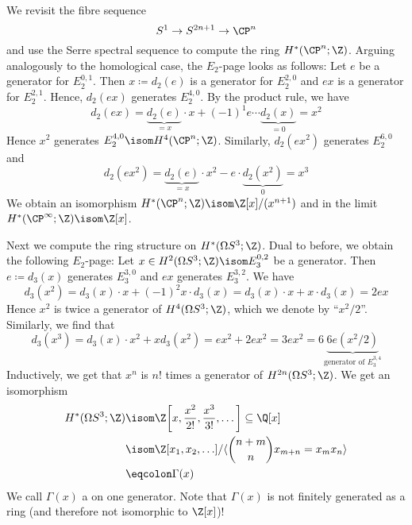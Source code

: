 \documentclass[wip, topology]{bsteffan-lecturenotes}
\begin{document}
\begin{example}
	We revisit the fibre sequence
	\begin{equation*}
		S^1 \to S^{2n + 1} \to \CP^n
	\end{equation*}
	and use the Serre spectral sequence to compute the ring $H^*(\CP^n; \Z)$.
	Arguing analogously to the homological case, the $E_2$-page looks as follows:
	Let $e$ be a generator for $E_2^{0, 1}$.
	Then $x \coloneq d_2(e)$ is a generator for $E_2^{2, 0}$ and $e x$ is a generator for $E_2^{2, 1}$.
	Hence, $d_2(ex)$ generates $E_2^{4, 0}$.
	By the product rule, we have
	\begin{equation*}
		d_2(ex) = \underbrace{d_2(e)}_{= x} \cdot x + (-1)^1 e \cdots \underbrace{d_2(x)}_{= 0} = x^2
	\end{equation*}
	Hence $x^2$ generates $E_2^{4, 0} \isom H^4(\CP^n; \Z)$.
	Similarly, $d_2(ex^2)$ generates $E_2^{6, 0}$ and
	\begin{equation*}
		d_2(ex^2) = \underbrace{d_2(e)}_{= x} \cdot x^2 - e \cdot \underbrace{d_2(x^2)}_{0} = x^3
	\end{equation*}
	We obtain an isomorphism $H^*(\CP^n; \Z) \isom \Z[x] / (x^{n + 1})$ and in the limit $H^*(\CP^\infty; \Z) \isom \Z[x]$.
\end{example}
\begin{example}
	Next we compute the ring structure on $H^*(\Omega S^3; \Z)$.
	Dual to before, we obtain the following $E_2$-page:
	Let $x \in H^2(\Omega S^3; \Z) \isom E_3^{0, 2}$ be a generator.
	Then $e \coloneq d_3(x)$ generates $E_3^{3, 0}$ and $ex$ generates $E_3^{3, 2}$.
	We have 
	\begin{equation*}
		d_3(x^2) = d_3(x) \cdot x + (-1)^2 x \cdot d_3(x) = d_3(x) \cdot x + x \cdot d_3(x) = 2ex
	\end{equation*}
	Hence $x^2$ is twice a generator of $H^4(\Omega S^3; \Z)$, which we denote by \enquote{$x^2 / 2$}.
	Similarly, we find that
	\begin{equation*}
		d_3(x^3) = d_3(x) \cdot x^2 + x d_3(x^2) = ex^2 + 2ex^2 = 3ex^2 = 6 \underbrace{6 e (x^2 / 2)}_{\text{generator of } E_3^{3, 4}}
	\end{equation*}
	Inductively, we get that $x^n$ is $n!$ times a generator of $H^{2n}(\Omega S^3; \Z)$.
	We get an isomorphism
	\begin{align*}
		H^*(\Omega S^3; \Z) &\isom \Z\bigg[x, \frac{x^2}{2!}, \frac{x^3}{3!}, \ldots\bigg] \subseteq \Q[x] \\
							&\isom \Z[x_1, x_2, \ldots] / \langle \binom{n + m}{n} x_{m + n} = x_m x_n \rangle \\
							&\eqcolon \Gamma(x)
	\end{align*}
	We call $\Gamma(x)$ a  on one generator.
	Note that $\Gamma(x)$ is not finitely generated as a ring (and therefore not isomorphic to $\Z[x]$)!
\end{example}
\end{document}
